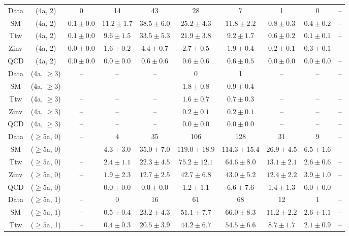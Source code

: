 \begin{table}[h!]
{\begin{tabular}{cccccccccc}
	Data & (4a, 2) & 0 & 14 & 43 & 28 & 7 & 1 & 0 & -- \\[0.5ex] 
	SM & (4a, 2) & $0.1\pm 0.0$ & $11.2\pm 1.7$ & $38.5\pm 6.0$ & $25.2\pm 4.3$ & $11.8\pm 2.2$ & $0.8\pm 0.3$ & $0.4\pm 0.2$ & -- \\[0.5ex] 
	Ttw & (4a, 2) & $0.1\pm 0.0$ & $9.6\pm 1.5$ & $33.5\pm 5.3$ & $21.9\pm 3.8$ & $9.2\pm 1.7$ & $0.6\pm 0.2$ & $0.1\pm 0.1$ & -- \\[0.5ex] 
	Zinv & (4a, 2) & $0.0\pm 0.0$ & $1.6\pm 0.2$ & $4.4\pm 0.7$ & $2.7\pm 0.5$ & $1.9\pm 0.4$ & $0.2\pm 0.1$ & $0.3\pm 0.1$ & -- \\[0.5ex] 
	QCD & (4a, 2) & $0.0\pm 0.0$ & $0.0\pm 0.0$ & $0.6\pm 0.6$ & $0.6\pm 0.6$ & $0.6\pm 0.5$ & $0.0\pm 0.0$ & $0.0\pm 0.0$ & -- \\[0.5ex] 
	Data & (4a, $\ge3$) & -- & -- & -- & 0 & 1 & -- & -- & -- \\[0.5ex] 
	SM & (4a, $\ge3$) & -- & -- & -- & $1.8\pm 0.8$ & $0.9\pm 0.4$ & -- & -- & -- \\[0.5ex] 
	Ttw & (4a, $\ge3$) & -- & -- & -- & $1.6\pm 0.7$ & $0.7\pm 0.3$ & -- & -- & -- \\[0.5ex] 
	Zinv & (4a, $\ge3$) & -- & -- & -- & $0.2\pm 0.1$ & $0.2\pm 0.1$ & -- & -- & -- \\[0.5ex] 
	QCD & (4a, $\ge3$) & -- & -- & -- & $0.0\pm 0.0$ & $0.0\pm 0.0$ & -- & -- & -- \\[0.5ex] 
	Data & ($\ge5$a, 0) & -- & 4 & 35 & 106 & 128 & 31 & 9 & -- \\[0.5ex] 
	SM & ($\ge5$a, 0) & -- & $4.3\pm 3.0$ & $35.0\pm 7.0$ & $119.0\pm 18.9$ & $114.3\pm 15.4$ & $26.9\pm 4.5$ & $6.5\pm 1.6$ & -- \\[0.5ex] 
	Ttw & ($\ge5$a, 0) & -- & $2.4\pm 1.1$ & $22.3\pm 4.5$ & $75.2\pm 12.1$ & $64.6\pm 8.0$ & $13.1\pm 2.1$ & $2.6\pm 0.6$ & -- \\[0.5ex] 
	Zinv & ($\ge5$a, 0) & -- & $1.9\pm 2.3$ & $12.7\pm 2.5$ & $42.7\pm 6.8$ & $43.0\pm 5.2$ & $12.4\pm 2.2$ & $3.9\pm 1.0$ & -- \\[0.5ex] 
	QCD & ($\ge5$a, 0) & -- & $0.0\pm 0.0$ & $0.0\pm 0.0$ & $1.2\pm 1.1$ & $6.6\pm 7.6$ & $1.4\pm 1.3$ & $0.0\pm 0.0$ & -- \\[0.5ex] 
	Data & ($\ge5$a, 1) & -- & 0 & 16 & 61 & 68 & 12 & 1 & -- \\[0.5ex] 
	SM & ($\ge5$a, 1) & -- & $0.5\pm 0.4$ & $23.2\pm 4.3$ & $51.1\pm 7.7$ & $66.0\pm 8.3$ & $11.2\pm 2.2$ & $2.6\pm 1.1$ & -- \\[0.5ex] 
	Ttw & ($\ge5$a, 1) & -- & $0.4\pm 0.3$ & $20.5\pm 3.9$ & $44.2\pm 6.7$ & $54.5\pm 6.6$ & $8.7\pm 1.7$ & $2.1\pm 0.9$ & -- \\[0.5ex] 

\end{tabular}}
\end{table}
